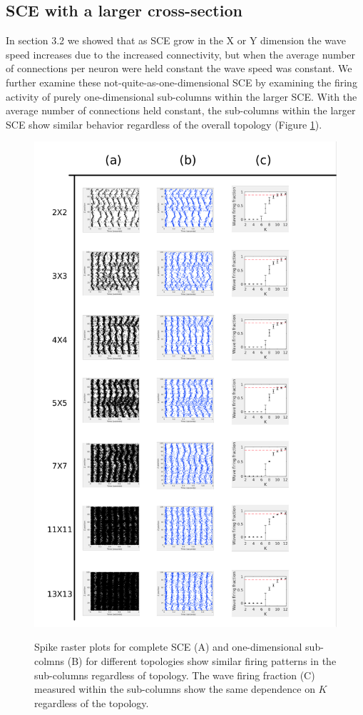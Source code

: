 \documentclass[12pt]{article}
\begin{document}
\subsection*{SCE with a larger cross-section}
In section 3.2 we showed that as SCE grow in the X or Y dimension the wave speed increases due to the increased connectivity, but when the average number of connections per neuron were held constant the wave speed was constant.
We further examine these not-quite-as-one-dimensional SCE by examining the firing activity of purely one-dimensional sub-columns within the larger SCE.
With the average number of connections held constant, the sub-columns within the larger SCE show similar behavior regardless of the overall topology (Figure \ref{fig:LargeSCESubcolumns}).
\begin{figure}[!htb]
 \caption{ Spike raster plots for complete SCE (A) and one-dimensional sub-colmns (B) for different topologies show similar firing patterns in the sub-columns regardless  of topology. 
           The wave firing fraction (C) measured within the sub-columns show the same dependence on $K$ regardless of the topology.}
   \includegraphics[width=\textwidth]{fig/WaveFractionVsThick}
   \label{fig:LargeSCESubcolumns}
\end{figure}
\FloatBarrier

\color{black}
\end{document}

